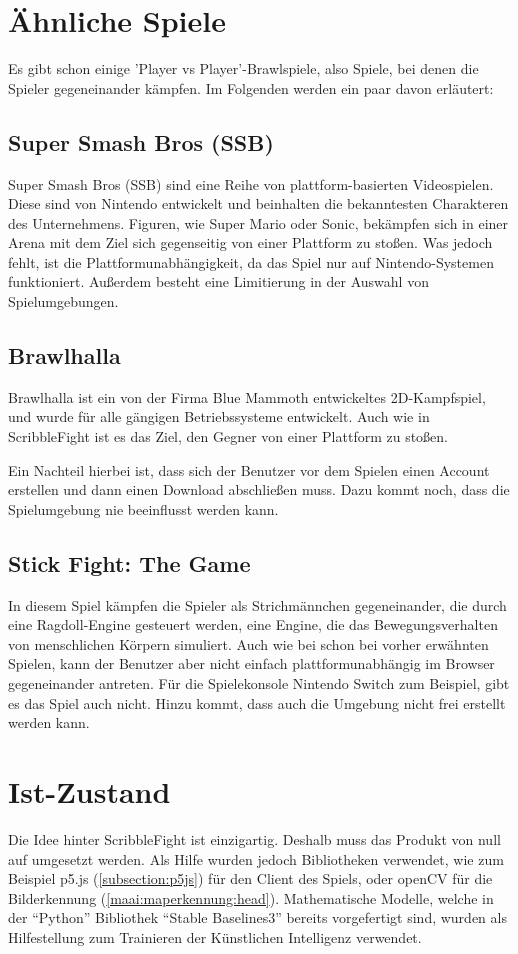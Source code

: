 \section{Ähnliche Spiele}
Es gibt schon einige 'Player vs Player'-Brawlspiele, also Spiele, bei denen die Spieler gegeneinander kämpfen. Im Folgenden werden ein paar davon erläutert:

\subsection{Super Smash Bros (SSB)}
Super Smash Bros (SSB) sind eine Reihe von plattform-basierten Videospielen.
Diese sind von Nintendo entwickelt und beinhalten die bekanntesten Charakteren des Unternehmens.
Figuren, wie Super Mario oder Sonic, bekämpfen sich in einer Arena mit dem Ziel sich gegenseitig
von einer Plattform zu stoßen.
Was jedoch fehlt, ist die Plattformunabhängigkeit, da das Spiel nur auf Nintendo-Systemen funktioniert.
Außerdem besteht eine Limitierung in der Auswahl von Spielumgebungen.

\subsection{Brawlhalla} \cite{brawlhalla}
Brawlhalla ist ein von der Firma Blue Mammoth entwickeltes 2D-Kampfspiel, und wurde für alle gängigen Betriebssysteme entwickelt.
Auch wie in ScribbleFight ist es das Ziel, den Gegner von einer Plattform zu stoßen.

Ein Nachteil hierbei ist, dass sich der Benutzer vor dem Spielen einen Account erstellen
und dann einen Download abschließen muss. Dazu kommt noch, dass die Spielumgebung nie beeinflusst werden kann.

\subsection{Stick Fight: The Game} \cite{stickfight}
In diesem Spiel kämpfen die Spieler als Strichmännchen gegeneinander, die durch eine Ragdoll-Engine gesteuert werden, eine Engine, die das Bewegungsverhalten von menschlichen Körpern simuliert.
Auch wie bei schon bei vorher erwähnten Spielen, kann der Benutzer aber nicht einfach plattformunabhängig im Browser gegeneinander antreten.
Für die Spielekonsole Nintendo Switch zum Beispiel, gibt es das Spiel auch nicht. Hinzu kommt, dass auch die Umgebung nicht frei erstellt werden kann.

\section{Ist-Zustand}
Die Idee hinter ScribbleFight ist einzigartig. Deshalb muss das Produkt von null auf umgesetzt werden. Als Hilfe wurden jedoch Bibliotheken verwendet, wie zum Beispiel p5.js (\ref{subsection:p5js}) für den Client des Spiels, oder openCV für die Bilderkennung (\ref{maai:maperkennung:head}).
Mathematische Modelle, welche in der ``Python'' Bibliothek ``Stable Baselines3'' bereits vorgefertigt sind, wurden
als Hilfestellung zum Trainieren der Künstlichen Intelligenz verwendet.
